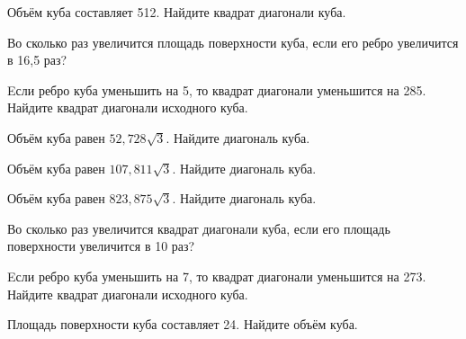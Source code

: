 \begin{taskBN}{75}
Объём куба составляет 512. Найдите квадрат диагонали куба.
\end{taskBN}

\begin{taskBN}{76}
Во сколько раз увеличится площадь поверхности куба, если его ребро увеличится в 16,5 раз?
\end{taskBN}

\begin{taskBN}{77}
Eсли ребро куба уменьшить на 5, то квадрат диагонали уменьшится на 285. Найдите квадрат диагонали исходного куба.
\end{taskBN}

\begin{taskBN}{78}
Объём куба равен $52,728\sqrt{3}$. Найдите диагональ куба.
\end{taskBN}

\begin{taskBN}{79}
Объём куба равен $107,811\sqrt{3}$. Найдите диагональ куба.
\end{taskBN}

\begin{taskBN}{80}
Объём куба равен $823,875\sqrt{3}$. Найдите диагональ куба.
\end{taskBN}

\begin{taskBN}{81}
Во сколько раз увеличится квадрат диагонали куба, если его площадь поверхности увеличится в 10 раз?
\end{taskBN}

\begin{taskBN}{82}
Eсли ребро куба уменьшить на 7, то квадрат диагонали уменьшится на 273. Найдите квадрат диагонали исходного куба.
\end{taskBN}

\begin{taskBN}{83}
Площадь поверхности куба составляет 24. Найдите объём куба.
\end{taskBN}

